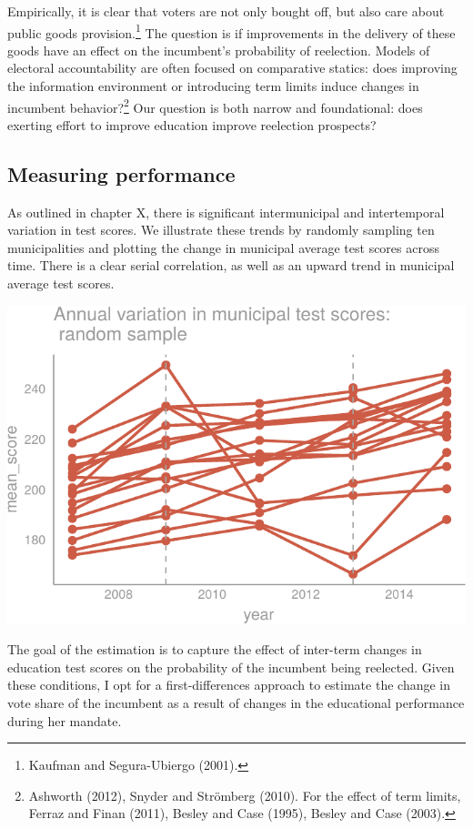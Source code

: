 \documentclass[12pt,]{article}
\let\rmarkdownfootnote\footnote%
\def\footnote{\protect\rmarkdownfootnote}
\begin{document}
Empirically, it is clear that voters are not only bought off, but also
care about public goods provision.\footnote{Kaufman and Segura-Ubiergo
  (2001).} The question is if improvements in the delivery of these
goods have an effect on the incumbent's probability of reelection.
Models of electoral accountability are often focused on comparative
statics: does improving the information environment or introducing term
limits induce changes in incumbent behavior?\footnote{Ashworth (2012),
  Snyder and Strömberg (2010). For the effect of term limits, Ferraz and
  Finan (2011), Besley and Case (1995), Besley and Case (2003).} Our
question is both narrow and foundational: does exerting effort to
improve education improve reelection prospects?

\hypertarget{measuring-performance}{%
\subsection{Measuring performance}\label{measuring-performance}}

As outlined in chapter X, there is significant intermunicipal and
intertemporal variation in test scores. We illustrate these trends by
randomly sampling ten municipalities and plotting the change in
municipal average test scores across time. There is a clear serial
correlation, as well as an upward trend in municipal average test
scores.

\begin{center}\includegraphics{dissertation_files/figure-latex/unnamed-chunk-25-1} \end{center}

The goal of the estimation is to capture the effect of inter-term
changes in education test scores on the probability of the incumbent
being reelected. Given these conditions, I opt for a first-differences
approach to estimate the change in vote share of the incumbent as a
result of changes in the educational performance during her mandate.
\end{document}
